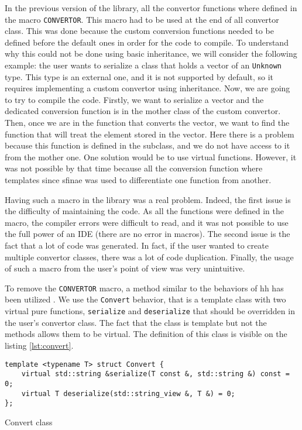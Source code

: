 In the previous version of the library, all the convertor functions where
defined in the macro \texttt{CONVERTOR}. This macro had to be used at the end of
all convertor class. This was done because the custom conversion functions
needed to be defined before the default ones in order for the code to compile.
To understand why this could not be done using basic inheritance, we will
consider the following example: the user wants to serialize a class that holds a
vector of an \texttt{Unknown} type. This type is an external one, and it is not
supported by default, so it requires implementing a custom convertor using
inheritance. Now, we are going to try to compile the code. Firstly, we want to
serialize a vector and the dedicated conversion function is in the mother class
of the custom convertor. Then, once we are in the function that converts the
vector, we want to find the function that will treat the element stored in the
vector. Here there is a problem because this function is defined in the
subclass, and we do not have access to it from the mother one. One solution
would be to use virtual functions. However, it was not possible by that time
because all the conversion function where templates since \gls{sfinae} was used
to differentiate one function from another.

Having such a macro in the library was a real problem. Indeed, the first issue
is the difficulty of maintaining the code. As all the functions were defined in
the macro, the compiler errors were difficult to read, and it was not possible
to use the full power of an IDE (there are no error in macros). The second issue
is the fact that a lot of code was generated. In fact, if the user wanted to
create multiple convertor classes, there was a lot of code duplication. Finally,
the usage of such a macro from the user's point of view was very unintuitive.

To remove the \texttt{CONVERTOR} macro, a method similar to the behaviors of
\gls{hh} has been utilized \cite{bardakoff2021analysis}. We use the
\texttt{Convert} behavior, that is a template class with two virtual pure
functions, \texttt{serialize} and \texttt{deserialize} that should be overridden
in the user's convertor class. The fact that the class is template but not the
methods allows them to be virtual. The definition of this class is visible on
the listing \ref{lst:convert}.

\begin{listing}[ht!]
\begin{verbatim}
template <typename T> struct Convert {
    virtual std::string &serialize(T const &, std::string &) const = 0;
    virtual T deserialize(std::string_view &, T &) = 0;
};
\end{verbatim}
\caption{Convert class}
\label{lst:Convert}
\end{listing}

